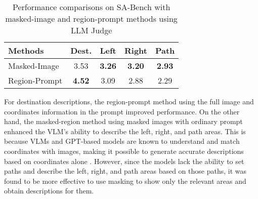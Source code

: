 \begin{table}[!ht]
    \vspace{-8pt}
    \caption{Performance comparisons on SA-Bench with masked-image and region-prompt methods using LLM Judge}
    \centering
    \vspace{-3mm}
    \begin{tabular}{|l|c|c|c|c|}
    \hline
        \textbf{Methods} &\textbf{ Dest.}  & \textbf{Left} & \textbf{Right} & \textbf{Path} \\ \hline\hline
        Masked-Image    & 3.53 & \textbf{3.26} & \textbf{3.20} & \textbf{2.93} \\ \hline
        Region-Prompt  & \textbf{4.52} & 3.09 & 2.88 & 2.29 \\ \hline
    \end{tabular}
    \label{table:masked_prompted}
    \vspace{-8pt}
\end{table}

For destination descriptions, the region-prompt method using the full image and coordinates information in the prompt improved performance. On the other hand, the masked-region method using masked images with ordinary prompt enhanced the VLM's ability to describe the left, right, and path areas. This is because VLMs and GPT-based models are known to understand and match coordinates with images, making it possible to generate accurate descriptions based on coordinates alone \cite{liu2023llava}. However, since the models lack the ability to set paths and describe the left, right, and path areas based on those paths, it was found to be more effective to use masking to show only the relevant areas and obtain descriptions for them.
